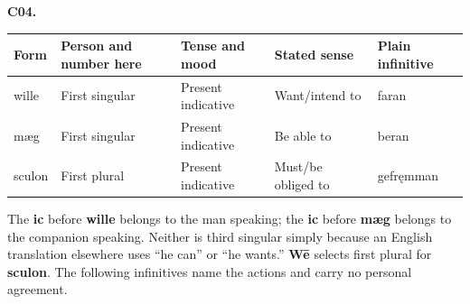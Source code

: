 \par\begin{minipage}{\linewidth}\raggedright
\textbf{C04.}

\par\begingroup
\fontsize{10.5}{13.2}\selectfont
\setlength{\LTleft}{0pt}\setlength{\LTright}{\fill}
\noindent
\begin{tabular}{@{}>{\raggedright\arraybackslash}p{17.41mm}>{\raggedright\arraybackslash}p{24.9mm}>{\raggedright\arraybackslash}p{23.68mm}>{\raggedright\arraybackslash}p{24.64mm}>{\raggedright\arraybackslash}p{22.12mm}@{}}
\toprule
\textbf{Form} & \textbf{Person and number here} & \textbf{Tense and mood} & \textbf{Stated sense} & \textbf{Plain infinitive} \\
\midrule
wille & First singular & Present indicative & Want/\allowbreak{}intend to & faran \\
mæg & First singular & Present indicative & Be able to & beran \\
sculon & First plural & Present indicative & Must/\allowbreak{}be obliged to & gefręmman \\
\bottomrule
\end{tabular}
\par\endgroup

The \textbf{ic} before \textbf{wille} belongs to the man speaking; the \textbf{ic} before \textbf{mæg} belongs to the companion speaking. Neither is third singular simply because an English translation elsewhere uses “he can” or “he wants.” \textbf{Wē} selects first plural for \textbf{sculon}. The following infinitives name the actions and carry no personal agreement.

\end{minipage}\par\addvspace{4pt}

